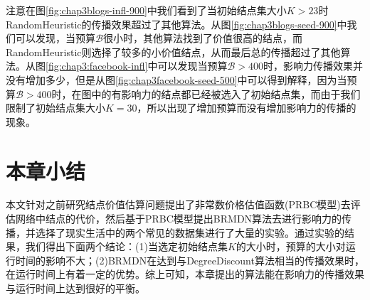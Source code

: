 注意在图\ref{fig:chap3blogs-infl-900}中我们看到了当初始结点集大小$K>23$时RandomHeuristic的传播效果超过了其他算法。从图\ref{fig:chap3blogs-seed-900}中我们可以发现，当预算$\mathcal{B}$很小时，其他算法找到了价值很高的结点，而RandomHeuristic则选择了较多的小价值结点，从而最后总的传播超过了其他算法。从图\ref{fig:chap3:facebook-infl}中可以发现当预算$\mathcal{B}>400$时，影响力传播效果并没有增加多少，但是从图\ref{fig:chap3facebook-seed-500}中可以得到解释，因为当预算$\mathcal{B}>400$时，在图中的有影响力的结点都已经被选入了初始结点集，而由于我们限制了初始结点集大小$K=30$，所以出现了增加预算而没有增加影响力的传播的现象。


\section{本章小结}
本文针对之前研究结点价值估算问题提出了非常数价格估值函数(PRBC模型)去评估网络中结点的代价，然后基于PRBC模型提出BRMDN算法去进行影响力的传播，并选择了现实生活中的两个常见的数据集进行了大量的实验。通过实验的结果，我们得出下面两个结论：(1)当选定初始结点集$K$的大小时，预算的大小对运行时间的影响不大；(2)BRMDN在达到与DegreeDiscount算法相当的传播效果时，在运行时间上有着一定的优势。综上可知，本章提出的算法能在影响力的传播效果与运行时间上达到很好的平衡。